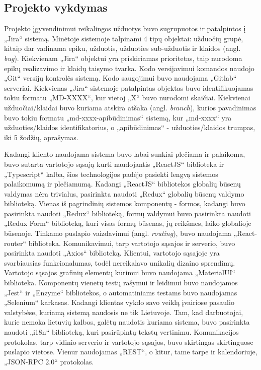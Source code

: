 \documentclass{VUMIFPSbakalaurinis}
\begin{document}
\subsection{Projekto vykdymas}

Projekto įgyvendinimui reikalingos užduotys buvo sugrupuotos ir patalpintos į „Jira“ sistemą. Minėtoje sistemoje talpinami 4 tipų objektai: užduočių grupė, kitaip dar vadinama epiku, užduotis, užduoties sub-užduotis ir klaidos (angl. \textit{bug}). Kiekvienam „Jira“ objektui yra priskiriamas prioritetas, taip nurodoma epikų realizavimo ir klaidų taisymo tvarka. Kodo versijavimui komandos naudojo „Git“ versijų kontrolės sistemą. Kodo saugojimui buvo naudojama „Gitlab“ serveriai. Kiekvienas „Jira“ sistemoje patalpintas objektas buvo identifikuojamas tokiu formatu „MD-XXXX“, kur vietoj „X“ buvo nurodomi skaičiai. Kiekvienai užduočiai/klaidai buvo kuriama atskira atšaka (angl. \textit{branch}), kurios pavadinimas buvo tokiu formatu „md-xxxx-apibūdinimas“ sistemą, kur „md-xxxx“ yra užduoties/klaidos identifikatorius, o „apibūdinimas“ - užduoties/klaidos trumpas, iki 5 žodžių, aprašymas.

Kadangi kliento naudojama sistema buvo labai sunkiai plečiama ir palaikoma, buvo sutarta vartotojo sąsają kurti naudojantis „ReactJS“ biblioteka ir „Typescript“ kalba, šios technologijos padėjo pasiekti lengvą sistemos palaikomumą ir plečiamumą. Kadangi „ReactJS“ bibliotekos globalių būsenų valdymas nėra trivialus, pasirinkta naudoti „Redux“ globalių būsenų valdymo biblioteką. Vienas iš pagrindinių sistemos komponentų - formos, kadangi buvo pasirinkta naudoti „Redux“ biblioteką, formų valdymui buvo pasirinkta naudoti „Redux Form“ biblioteką, kuri visas formų būsenas, jų reikšmes, laiko globalioje būsenoje. Tinkamo puslapio vaizdavimui (angl. \textit{routing}), buvo naudojama „React-router“ biblioteka. Komunikavimui, tarp vartotojo sąsajos ir serverio, buvo pasirinkta naudoti „Axios“ biblioteką. Klientui, vartotojo sąsajoje yra svarbiausias funkcionalumas, todėl nereikalavo unikalių dizaino sprendimų. Vartotojo sąsajos grafinių elementų kūrimui buvo naudojama „MaterialUI“ biblioteka. Komponentų vienetų testų rašymui ir leidimui buvo naudojamos „Jest“ ir „Enzyme“ bibliotekos, o automatiniams testams buvo naudojamas „Selenium“ karkasas. Kadangi klientas vykdo savo veiklą įvairiose pasaulio valstybėse, kuriamą sistemą naudosis ne tik Lietuvoje. Tam, kad darbuotojai, kurie nemoka lietuvių kalbos, galėtų naudotis kuriama sistema, buvo pasirinkta naudoti „i18n“ biblioteką, kuri pasirūpintų tekstų vertinimu. Komunikacijos protokolas, tarp vidinio serverio ir vartotojo sąsajos, buvo skirtingas skirtinguose puslapio vietose. Vienur naudojamas „REST“, o kitur, tame tarpe ir kalendoriuje, „JSON-RPC 2.0“ protokolas.
\end{document}
